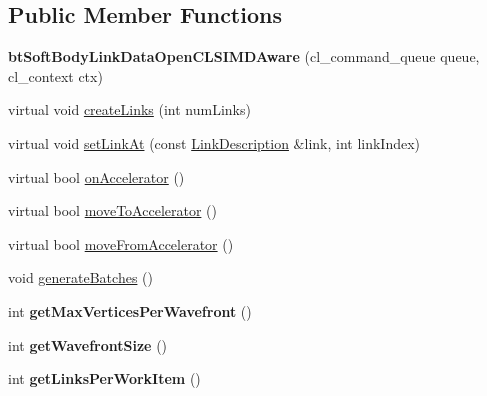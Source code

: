 \subsection*{Public Member Functions}
\begin{DoxyCompactItemize}
\item 
\hypertarget{classbt_soft_body_link_data_open_c_l_s_i_m_d_aware_ae2bb335b68de0888086496e38f6208b7}{{\bfseries bt\+Soft\+Body\+Link\+Data\+Open\+C\+L\+S\+I\+M\+D\+Aware} (cl\+\_\+command\+\_\+queue queue, cl\+\_\+context ctx)}\label{classbt_soft_body_link_data_open_c_l_s_i_m_d_aware_ae2bb335b68de0888086496e38f6208b7}

\item 
virtual void \hyperlink{classbt_soft_body_link_data_open_c_l_s_i_m_d_aware_a43ee8b9067c214c87e073057a63071ba}{create\+Links} (int num\+Links)
\item 
virtual void \hyperlink{classbt_soft_body_link_data_open_c_l_s_i_m_d_aware_a9a1482f91ff8105f41a1f991e183e120}{set\+Link\+At} (const \hyperlink{classbt_soft_body_link_data_1_1_link_description}{Link\+Description} \&link, int link\+Index)
\item 
virtual bool \hyperlink{classbt_soft_body_link_data_open_c_l_s_i_m_d_aware_a5016c89bbdf9c87283c138d629f34601}{on\+Accelerator} ()
\item 
virtual bool \hyperlink{classbt_soft_body_link_data_open_c_l_s_i_m_d_aware_a37ded0994aded2026babb6c35838af75}{move\+To\+Accelerator} ()
\item 
virtual bool \hyperlink{classbt_soft_body_link_data_open_c_l_s_i_m_d_aware_a9eed0794cbaa4b7f0c8dd1fc5570c15f}{move\+From\+Accelerator} ()
\item 
void \hyperlink{classbt_soft_body_link_data_open_c_l_s_i_m_d_aware_afe1f0f82b680db86b53f86711444e5e0}{generate\+Batches} ()
\item 
\hypertarget{classbt_soft_body_link_data_open_c_l_s_i_m_d_aware_aaa92ad2be3e876c9f166c25359428782}{int {\bfseries get\+Max\+Vertices\+Per\+Wavefront} ()}\label{classbt_soft_body_link_data_open_c_l_s_i_m_d_aware_aaa92ad2be3e876c9f166c25359428782}

\item 
\hypertarget{classbt_soft_body_link_data_open_c_l_s_i_m_d_aware_aebd97637efa9006aa0a8dc7e0d3399b4}{int {\bfseries get\+Wavefront\+Size} ()}\label{classbt_soft_body_link_data_open_c_l_s_i_m_d_aware_aebd97637efa9006aa0a8dc7e0d3399b4}

\item 
\hypertarget{classbt_soft_body_link_data_open_c_l_s_i_m_d_aware_aba4551d9c0fd8035ff1db4b5584ce2c9}{int {\bfseries get\+Links\+Per\+Work\+Item} ()}\label{classbt_soft_body_link_data_open_c_l_s_i_m_d_aware_aba4551d9c0fd8035ff1db4b5584ce2c9}


\end{DoxyCompactItemize}
